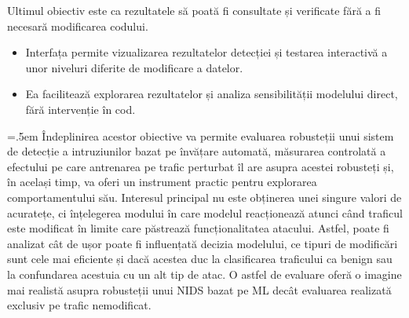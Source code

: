 \begin{description}[style=nextline]
\item[Obiectivul 7. Punerea rezultatelor într-o formă explorabilă de către utilizator.]
Ultimul obiectiv este ca rezultatele să poată fi consultate și verificate fără a fi necesară
modificarea codului.
\begin{itemize}
    \item Interfața permite vizualizarea rezultatelor detecției și testarea interactivă a unor
    niveluri diferite de modificare a datelor.
    \item Ea facilitează explorarea rezultatelor și analiza sensibilității modelului direct, fără
    intervenție în cod.
\end{itemize}

\end{description}

\medskip

{\emergencystretch=.5em
Îndeplinirea acestor obiective va permite evaluarea ro\-bus\-te\-ții unui sistem de detecție a intruziunilor bazat pe învățare automată, măsurarea controlată a efectului pe care antrenarea pe trafic perturbat îl are asupra acestei robusteți și, în același timp, va oferi un instrument practic pentru explorarea comportamentului său. Interesul principal nu este obținerea unei singure valori de acuratețe, ci înțelegerea modului în care modelul reacționează atunci când traficul este modificat în limite care păstrează funcționalitatea atacului. Astfel, poate fi analizat cât de ușor poate fi influențată decizia modelului, ce tipuri de modificări sunt cele mai eficiente și dacă acestea duc la clasificarea traficului ca benign sau la confundarea acestuia cu un alt tip de atac. O astfel de evaluare oferă o imagine mai realistă asupra robusteții unui NIDS bazat pe ML decât evaluarea realizată exclusiv pe trafic nemodificat.\par}
